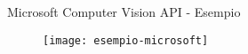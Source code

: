 %
\begin{frame}[t]{Microsoft Computer Vision API - Esempio}
	\begin{figure}[h]
	\centering
	    \texttt{[image: esempio-microsoft]}
		\label{fig:esempio-microsoft}
	\end{figure}
\end{frame}
%
